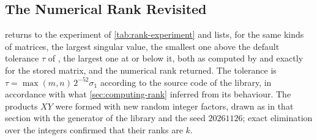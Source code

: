 \subsection{The Numerical Rank Revisited}

 returns to the experiment of \cref{tab:rank-experiment} and lists, for the same kinds of matrices, the largest singular value, the smallest one above the default tolerance $\tau$ of , the largest one at or below it, both as computed by  and exactly for the stored matrix, and the numerical rank returned. The tolerance is $\tau=\max(m,n)\,2^{-52}\sigma_1$ according to the source code of the library, in accordance with what \cref{sec:computing-rank} inferred from its behaviour. The products $XY$ were formed with new random integer factors, drawn as in that section with the generator of the library and the seed $20261126$; exact elimination over the integers confirmed that their ranks are $k$.

